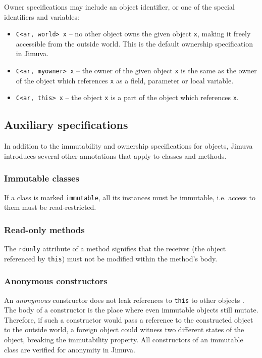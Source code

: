 \documentclass{pracamgr}
\newcommand{\todo}[1]{}
\begin{document}
Owner specifications may include an object identifier, or one of the
special identifiers and variables:
\begin{itemize}
\item \texttt{C<ar, world> x} -- no other object owns the given object
  \texttt{x}, making it freely accessible from the outside world. This
  is the default ownership specification in Jimuva.
\item \texttt{C<ar, myowner> x} -- the owner of the given object
  \texttt{x} is the same as the owner of the object which references
  \texttt{x} as a field, parameter or local variable.
\item \texttt{C<ar, this> x} -- the object \texttt{x} is a part of the 
  object which references \texttt{x}. 
\end{itemize}

\subsection{Auxiliary specifications}

In addition to the immutability and ownership specifications for
objects, Jimuva introduces several other annotations that apply to
classes and methods.

\subsubsection{Immutable classes}

If a class is marked \texttt{immutable}, all its instances must be
immutable, i.e. access to them must be read-restricted.

\subsubsection{Read-only methods}

The \texttt{rdonly} attribute of a method signifies that the receiver
(the object referenced by \texttt{this}) must not be modified within
the method's body.

\subsubsection{Anonymous constructors}

An \emph{anonymous} constructor does not leak references to
\texttt{this} to other objects \cite{vitek}. The body of a constructor
is the place where even immutable objects still mutate. Therefore, if
such a constructor would pass a reference to the constructed object to
the outside world, a foreign object could witness two different states
of the object, breaking the immutability property. All constructors of
an immutable class are verified for anonymity in
Jimuva. \todo{reference?}
\end{document}
